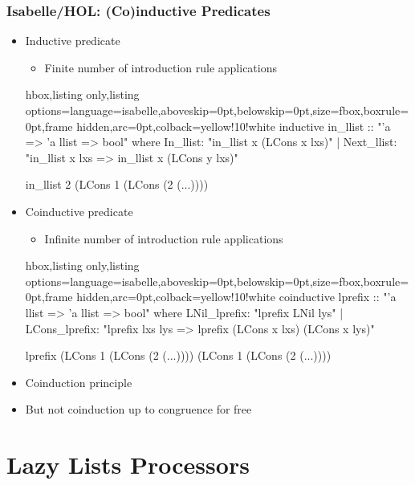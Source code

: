 \documentclass[aspectratio=169,10pt]{beamer}
\begin{document}
\begin{frame}[fragile]
  \frametitle{Isabelle/HOL: (Co)inductive Predicates}
  \begin{itemize}
    \item Inductive predicate
          \begin{itemize}
            \item Finite number of introduction rule applications
          \end{itemize}
\begin{tcblisting}{hbox,listing only,listing options={language=isabelle,aboveskip=0pt,belowskip=0pt},size=fbox,boxrule=0pt,frame hidden,arc=0pt,colback=yellow!10!white}
inductive in_llist :: "'a => 'a llist => bool" where
    In_llist: "in_llist x (LCons x lxs)"
  | Next_llist: "in_llist x lxs => in_llist x (LCons y lxs)"

in_llist 2 (LCons 1 (LCons (2 (...))))
\end{tcblisting}
          \pause
    \item Coinductive predicate
          \begin{itemize}
            \item Infinite number of introduction rule applications
          \end{itemize}
\begin{tcblisting}{hbox,listing only,listing options={language=isabelle,aboveskip=0pt,belowskip=0pt},size=fbox,boxrule=0pt,frame hidden,arc=0pt,colback=yellow!10!white}
coinductive lprefix :: "'a llist => 'a llist => bool" where
    LNil_lprefix: "lprefix LNil lys"
  | LCons_lprefix: "lprefix lxs lys => lprefix (LCons x lxs) (LCons x lys)"

lprefix (LCons 1 (LCons (2 (...)))) (LCons 1 (LCons (2 (...))))
\end{tcblisting}
          \pause
    \item Coinduction principle
    \item But not coinduction up to congruence for free
  \end{itemize}
\end{frame}

\section{Lazy Lists Processors}
\end{document}
